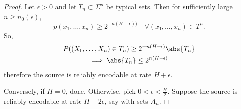 \documentclass{article}
\begin{document}
\begin{proof}Let $\epsilon > 0$ and let $T_n \subset \Sigma^n$ be typical sets.
    Then for sufficiently large $n \geq n_0(\epsilon)$,
    \begin{equation*}
        p(x_1, \dotsc, x_n) \geq 2^{-n (H + \epsilon))} \quad \forall (x_1, \dotsc, x_n) \in T^n.
    \end{equation*}
    So,
    \begin{gather*}
        P((X_1, \dotsc, X_n) \in T_n) \geq 2^{-n(H+\epsilon)} \abs{T_n} \\
        \implies \abs{T_n} \leq 2^{n(H+\epsilon)}
    \end{gather*}
    therefore the source is \hyperlink{def:reliablyEncode}{reliably encodable} at rate $H+\epsilon$.

    Conversely, if $H=0$, done. Otherwise, pick $0 < \epsilon < \frac{H}{2}$. Suppose the source is reliably encodable at rate $H - 2 \epsilon$, say with sets $A_n$.
\end{proof}
\end{document}
